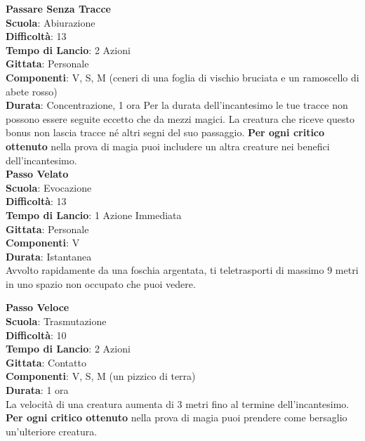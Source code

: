\begin{multicols}{2}
\medskip\textbf{Passare Senza Tracce}\\
\textbf{Scuola}: Abiurazione\\
\textbf{Difficoltà}: 13\\
\textbf{Tempo di Lancio}: 2 Azioni\\
\textbf{Gittata}: Personale\\
\textbf{Componenti}: V, S, M (ceneri di una foglia di vischio bruciata e un ramoscello di abete rosso)\\
\textbf{Durata}: Concentrazione, 1 ora
Per la durata dell'incantesimo le tue tracce non possono essere seguite eccetto che da mezzi magici. La creatura che riceve questo bonus non lascia tracce né altri segni del suo passaggio.
\textbf{Per ogni critico ottenuto} nella prova di magia puoi includere un altra creature nei benefici dell'incantesimo.\\


\medskip\textbf{Passo Velato}\\
\textbf{Scuola}: Evocazione\\
\textbf{Difficoltà}: 13\\
\textbf{Tempo di Lancio}: 1 Azione Immediata\\
\textbf{Gittata}: Personale\\
\textbf{Componenti}: V\\
\textbf{Durata}: Istantanea\\
Avvolto rapidamente da una foschia argentata, ti teletrasporti di massimo 9 metri in uno spazio non occupato che puoi vedere.

\medskip\textbf{Passo Veloce}\\
\textbf{Scuola}: Trasmutazione\\
\textbf{Difficoltà}: 10\\
\textbf{Tempo di Lancio}: 2 Azioni\\
\textbf{Gittata}: Contatto\\
\textbf{Componenti}: V, S, M (un pizzico di terra)\\
\textbf{Durata}: 1 ora\\
La velocità di una creatura aumenta di 3 metri fino al termine dell'incantesimo. \\
\textbf{Per ogni critico ottenuto} nella prova di magia puoi prendere come bersaglio un'ulteriore creatura.


\end{multicols}
